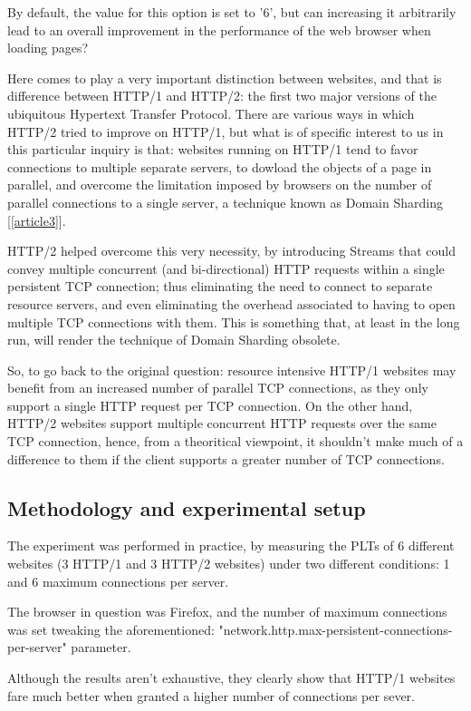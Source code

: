 \documentclass[a4paper,10pt]{article}
\begin{document}
By default, the value for this option is set to '6', but can increasing it arbitrarily lead to an overall improvement in the performance of the web browser when loading pages? 

Here comes to play a very important distinction between websites, and that is difference between HTTP/1 and HTTP/2: the first two major versions of the ubiquitous Hypertext Transfer Protocol. There are various ways in which HTTP/2 tried to improve on HTTP/1, but what is of specific interest to us in this particular inquiry is that: websites running on HTTP/1 tend to favor connections to multiple separate servers, to dowload the objects of a page in parallel, and overcome the limitation imposed by browsers on the number of parallel connections to a single server, a technique known as Domain Sharding [\ref{article3}]. 

HTTP/2 helped overcome this very necessity, by introducing Streams that could convey multiple
concurrent (and bi-directional) HTTP requests within a single persistent TCP connection; thus eliminating the need to connect to separate resource servers, and even eliminating the overhead associated to having to open multiple TCP connections with them. This is something that, at least in the long run, will render the technique of Domain Sharding obsolete.

So, to go back to the original question: resource intensive HTTP/1 websites may benefit from an increased number of parallel TCP connections, as they only support a single HTTP request per TCP connection. On the other hand, HTTP/2 websites support multiple concurrent HTTP requests over the same TCP connection, hence, from a theoritical viewpoint, it shouldn't make much of a difference to them if the client supports a greater number of TCP connections.


\subsection{Methodology and experimental setup}

The experiment was performed in practice, by measuring the PLTs of 6 different websites (3 HTTP/1 and 3 HTTP/2 websites) under two different conditions: 1 and 6 maximum connections per server.

The browser in question was Firefox, and the number of maximum connections was set tweaking the aforementioned: "network.http.max-persistent-connections-per-server" parameter.

Although the results aren't exhaustive, they clearly show that HTTP/1 websites fare much better when granted a higher number of connections per sever.
\end{document}
